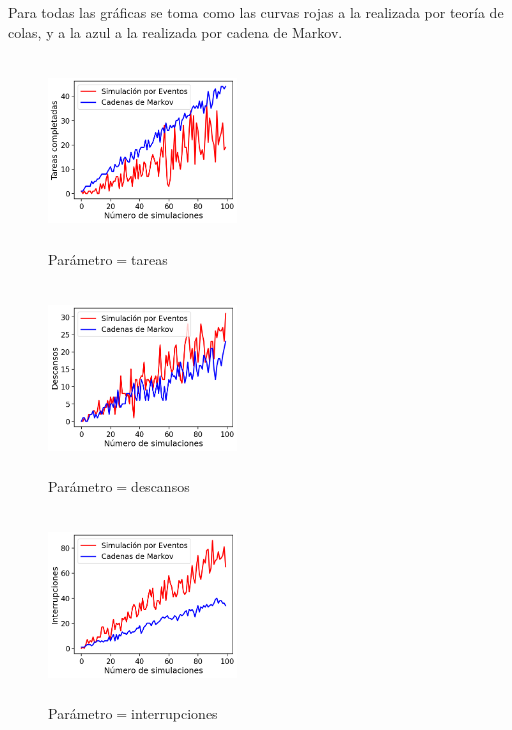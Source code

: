 \documentclass[10pt,a4paper,twocolumn]{article}
\begin{document}
Para todas las gr\'aficas se toma como las curvas rojas a la realizada por teor\'ia
de colas, y a la azul a la realizada por cadena de Markov.

\begin{figure}[H] %
    \centering %
    \includegraphics[width=5cm, height=5cm]{markov1.png} %
    \caption{Par\'ametro$ = $tareas} %
    \label{fig:mi_imagen1} %
\end{figure}

\begin{figure}[H] %
    \centering 
    \includegraphics[width=5cm, height=5cm]{markov2.png} 
    \caption{Par\'ametro$ = $descansos} 
    \label{fig:mi_imagen2} 
\end{figure}

\begin{figure}[H] %
    \centering 
    \includegraphics[width=5cm, height=5cm]{markov3.png} 
    \caption{Par\'ametro$ = $interrupciones} 
    \label{fig:mi_imagen3} 
\end{figure}
\end{document}
